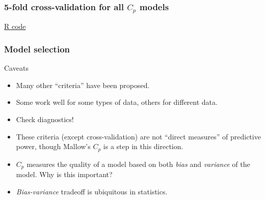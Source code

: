 \documentclass[handout]{beamer}
\begin{document}


   \begin{frame}
   \frametitle{5-fold cross-validation for all $C_p$ models}
   \begin{center}
   \end{center}
   \href{http://stats191.stanford.edu/selection.html#election-example-best-subset}{R code}
   \end{frame}


   \begin{frame} \frametitle{Model selection}

   \begin{block}
   {Caveats}

   \begin{itemize}[<+->]

   \item Many other ``criteria'' have been proposed.
   \item Some work well for some types of data, others for different data.

   \item Check diagnostics!

   \item These criteria (except cross-validation) are not ``direct measures'' of predictive power, though Mallow's $C_p$ is a step in this direction.

   \item $C_p$ measures the quality of a model based on both
   {\em bias} and {\em variance} of the model. Why is this important?

   \item {\em Bias-variance} tradeoff is ubiquitous in statistics.
   \end{itemize}
   \end{block}
   \end{frame}

\end{document}
